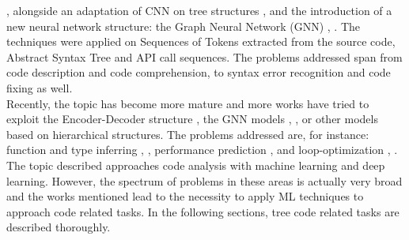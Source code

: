 \cite{bhatia2016automated},
alongside an adaptation of CNN on tree structures \cite{mou2016convolutional}, \cite{bui2018cross}
and  the introduction of a new neural network structure: the Graph Neural Network (GNN) \cite{allamanis2017learning}, \cite{scarselli2008graph}. The techniques were applied on 
Sequences of Tokens extracted from the source code, Abstract Syntax Tree \cite{mou2016convolutional} and API call sequences. 
The problems addressed span from code description and code comprehension, to syntax error recognition \cite{santos2018syntax}
and code fixing as well.\\
\newline
Recently, the topic has become more mature and more works have tried to exploit the 
Encoder-Decoder structure \cite{alon2018code2seq}, the GNN models \cite{allamanis2021self}, \cite{brauckmann2020compiler}, or other models 
based on hierarchical structures. The problems addressed are, for instance: function and 
type inferring \cite{alon2019code2vec}, \cite{pradel2020typewriter}, performance prediction \cite{mendis2019ithemal}, and loop-optimization \cite{haj2020neurovectorizer}, \cite{brauckmann2020compiler}.\\
\newline
The topic described approaches code analysis with machine learning and deep learning. However, 
the spectrum of problems in these areas is actually very broad and the works mentioned lead to the 
necessity to apply ML techniques to approach code related tasks. In the following sections, tree code related
tasks are described thoroughly.

